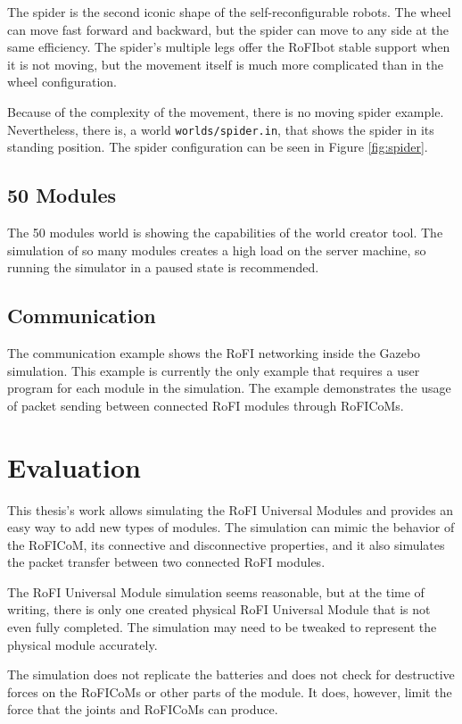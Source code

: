 \documentclass[
  printed, %
  color,   %
  notable, %
  oneside, %
  nolof,   %
  nolot,   %
  nocover,
]{fithesis3}
\newcommand{\code}[1]{\texttt{#1}}
\begin{document}
The spider is the second iconic shape of the self-reconfigurable robots.
The wheel can move fast forward and backward, but the spider can move to any side at the same efficiency.
The spider's multiple legs offer the RoFIbot stable support when it is not moving, but the movement itself is much more complicated than in the wheel configuration.

Because of the complexity of the movement, there is no moving spider example.
Nevertheless, there is, a world \code{worlds/spider.in}, that shows the spider in its standing position.
The spider configuration can be seen in Figure \ref{fig:spider}.

\subsection{50 Modules}

The 50 modules world is showing the capabilities of the world creator tool.
The simulation of so many modules creates a high load on the server machine, so running the simulator in a paused state is recommended.

\subsection{Communication}

The communication example shows the RoFI networking inside the Gazebo simulation.
This example is currently the only example that requires a user program for each module in the simulation.
The example demonstrates the usage of packet sending between connected RoFI modules through RoFICoMs.


\section{Evaluation}

This thesis's work allows simulating the RoFI Universal Modules and provides an easy way to add new types of modules.
The simulation can mimic the behavior of the RoFICoM, its connective and disconnective properties, and it also simulates the packet transfer between two connected RoFI modules.

The RoFI Universal Module simulation seems reasonable, but at the time of writing, there is only one created physical RoFI Universal Module that is not even fully completed.
The simulation may need to be tweaked to represent the physical module accurately.

The simulation does not replicate the batteries and does not check for destructive forces on the RoFICoMs or other parts of the module.
It does, however, limit the force that the joints and RoFICoMs can produce.
\end{document}
